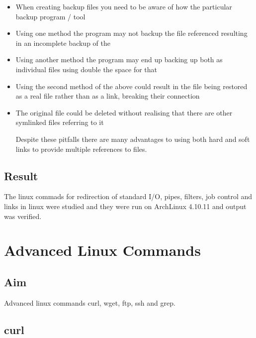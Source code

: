 \documentclass{article}
\begin{document}
\begin{itemize}
\begin{itemize}
\item When creating backup files you need to be aware of how the particular backup program / tool 

\item Using one method the program may not backup the file referenced resulting in an incomplete backup of the 

\item Using another method the program may end up backing up both as individual files using double the space for that 

\item Using the second method of the above could result in the file being restored as a real file rather than as a link, breaking their connection

\item The original file could be deleted without realising that there are other symlinked files referring to it

Despite these pitfalls there are many advantages to using both hard and soft links to provide multiple references to files.
				
\end{itemize}
\end{itemize}


\subsection {Result}

The linux commads for redirection of standard I/O, pipes, filters, job control and links in linux were studied and they were run on ArchLinux 4.10.11 and output was verified.

\begin{refsection}
\cite{jobcontrol}
\cite{piperedirection}
\cite{linuxbook}
\printbibliography
\end{refsection}
\newpage
\section{Advanced Linux Commands}

\subsection{Aim}
Advanced linux commands curl, wget, ftp, ssh and grep.

\subsection{curl}
\end{document}
